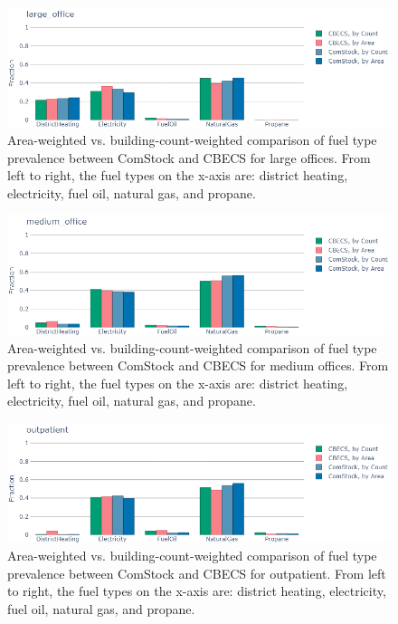 \begin{figure}
  \centering
  \includegraphics[scale=0.5]{figures/cbecs_comstock_fuel_comparison_large_office.png}
  \caption[Comparison of fuel type prevalence between ComStock and CBECS for large offices]{Area-weighted vs. building-count-weighted comparison of fuel type prevalence between ComStock and CBECS for large offices. From left to right, the fuel types on the x-axis are: district heating, electricity, fuel oil, natural gas, and propane.}
  \label{fig:cbecs_comstock_fuel_comparison_large_office}
\end{figure}

\begin{figure}
  \centering
  \includegraphics[scale=0.5]{figures/cbecs_comstock_fuel_comparison_medium_office.png}
  \caption[Comparison of fuel type prevalence between ComStock and CBECS for medium offices]{Area-weighted vs. building-count-weighted comparison of fuel type prevalence between ComStock and CBECS for medium offices. From left to right, the fuel types on the x-axis are: district heating, electricity, fuel oil, natural gas, and propane.}
  \label{fig:cbecs_comstock_fuel_comparison_medium_office}
\end{figure}

\begin{figure}
  \centering
  \includegraphics[scale=0.5]{figures/cbecs_comstock_fuel_comparison_outpatient.png}
  \caption[Comparison of fuel type prevalence between ComStock and CBECS for outpatient]{Area-weighted vs. building-count-weighted comparison of fuel type prevalence between ComStock and CBECS for outpatient. From left to right, the fuel types on the x-axis are: district heating, electricity, fuel oil, natural gas, and propane.}
  \label{fig:cbecs_comstock_fuel_comparison_outpatient}
\end{figure}

